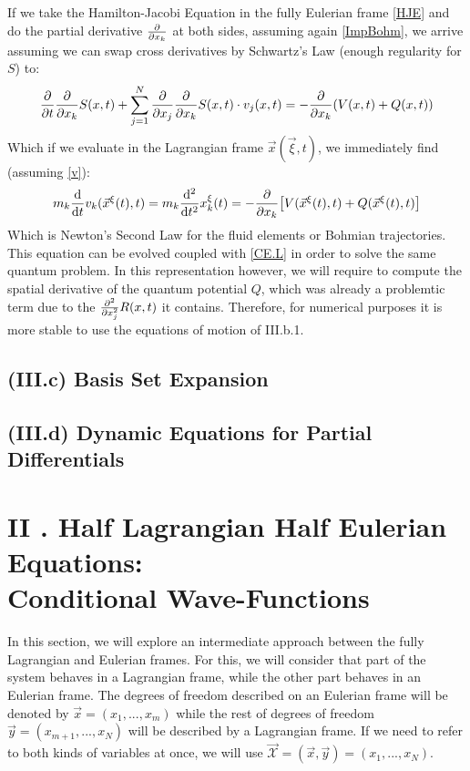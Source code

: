 \documentclass[11pt, a4paper]{article} %
\newcommand{\x}{\mathcal{X}}
\begin{document}
If we take the Hamilton-Jacobi Equation in the fully Eulerian frame \eqref{HJE} and do the partial derivative $\pdv{}{x_k}$ at both sides, assuming again \eqref{ImpBohm}, we arrive assuming we can swap cross derivatives by Schwartz's Law (enough regularity for $S$) to:
\begin{equation}
\pdv{}{t}\pdv{}{x_k}S(x,t)+\sum_{j=1}^N\pdv{}{x_j}\pdv{}{x_k}S(x,t)\cdot v_j(x,t)=-\pdv{}{x_k}\qty(V(x,t)+Q(x,t))
\end{equation}
Which if we evaluate in the Lagrangian frame $\vec{x}(\vec{\xi},t)$, we immediately find (assuming \eqref{v}):
\begin{equation}
m_k\dv{}{t}v_k(\vec{x}^\xi(t),t)=m_k\dv[2]{}{t}x^\xi_k(t)=-\pdv{}{x_k}\qty[V(\vec{x}^\xi(t),t)+Q(\vec{x}^\xi(t),t) ]
\end{equation}
Which is Newton's Second Law for the fluid elements or Bohmian trajectories. This equation can be evolved coupled with \eqref{CE.L} in order to solve the same quantum problem. In this representation however, we will require to compute the spatial derivative of the quantum potential $Q$, which was already a problemtic term due to the $\pdv[2]{}{x_j}R(x,t)$ it contains. Therefore, for numerical purposes it is more stable to use the equations of motion of III.b.1.


\subsection*{(III.c) Basis Set Expansion}
\subsection*{(III.d) Dynamic Equations for Partial Differentials}

\section*{II . Half Lagrangian Half Eulerian Equations:\\ Conditional Wave-Functions}
In this section, we will explore an intermediate approach between the fully Lagrangian and Eulerian frames. For this, we will consider that part of the system behaves in a Lagrangian frame, while the other part behaves in an Eulerian frame. The degrees of freedom described on an Eulerian frame will be denoted by $\vec{x}=(x_1,...,x_m)$ while the rest of degrees of freedom $\vec{y}=(x_{m+1},...,x_N)$ will be described by a Lagrangian frame. If we need to refer to both kinds of variables at once, we will use $\vec{\x}=(\vec{x}, \vec{y})=(x_1,...,x_N)$.
\end{document}
